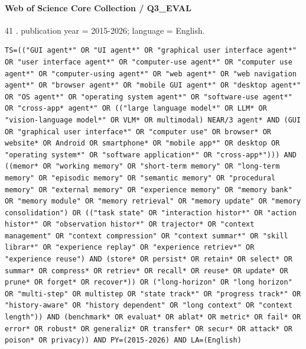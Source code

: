 \noindent\begin{minipage}{\linewidth}
\paragraph{Web of Science Core Collection / Q3\_EVAL}
41 .
publication year = 2015-2026; language = English.
\begin{lstlisting}
TS=(("GUI agent*" OR "UI agent*" OR "graphical user interface agent*" OR "user interface agent*" OR "computer-use agent*" OR "computer use agent*" OR "computer-using agent*" OR "web agent*" OR "web navigation agent*" OR "browser agent*" OR "mobile GUI agent*" OR "desktop agent*" OR "OS agent*" OR "operating system agent*" OR "software-use agent*" OR "cross-app* agent*" OR (("large language model*" OR LLM* OR "vision-language model*" OR VLM* OR multimodal) NEAR/3 agent* AND (GUI OR "graphical user interface*" OR "computer use" OR browser* OR website* OR Android OR smartphone* OR "mobile app*" OR desktop OR "operating system*" OR "software application*" OR "cross-app*"))) AND ((memor* OR "working memory" OR "short-term memory" OR "long-term memory" OR "episodic memory" OR "semantic memory" OR "procedural memory" OR "external memory" OR "experience memory" OR "memory bank" OR "memory module" OR "memory retrieval" OR "memory update" OR "memory consolidation") OR (("task state" OR "interaction histor*" OR "action histor*" OR "observation histor*" OR trajector* OR "context management" OR "context compression" OR "context summar*" OR "skill librar*" OR "experience replay" OR "experience retriev*" OR "experience reuse") AND (store* OR persist* OR retain* OR select* OR summar* OR compress* OR retriev* OR recall* OR reuse* OR update* OR prune* OR forget* OR recover*)) OR ("long-horizon" OR "long horizon" OR "multi-step" OR multistep OR "state track*" OR "progress track*" OR "history-aware" OR "history dependent" OR "long context" OR "context length")) AND (benchmark* OR evaluat* OR ablat* OR metric* OR fail* OR error* OR robust* OR generaliz* OR transfer* OR secur* OR attack* OR poison* OR privacy)) AND PY=(2015-2026) AND LA=(English)
\end{lstlisting}
\end{minipage}\par\medskip
